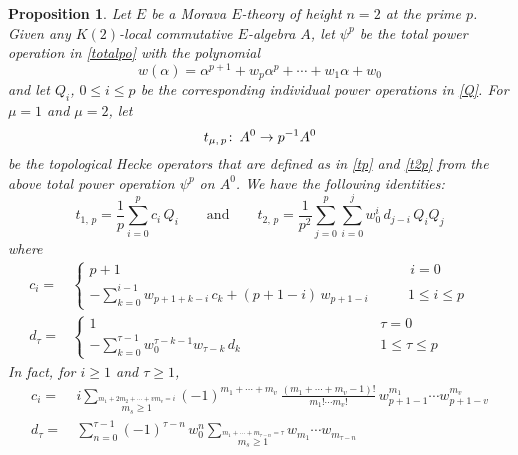 \documentclass{gtpart}
\newtheorem{prop}[equation]{Proposition}
\theoremstyle{definition}
\theoremstyle{remark}
\def\co{\colon\thinspace}
\newcommand{\ad}{\text{and}}
\newcommand{\A}{\alpha}
\newcommand{\T}{\tau}
\renewcommand{\=}{\approx}
\renewcommand{\-}{\sim}
\numberwithin{equation}{section}
\begin{document}
\begin{prop}
 \label{prop:Q}
 Let $E$ be a Morava $E$-theory of height $n = 2$ at the prime $p$.  Given any 
 $K(2)$-local commutative $E$-algebra $A$, let $\psi^p$ be the total power 
 operation in \eqref{totalpo} with the polynomial 
 \begin{equation}
  \label{wi}
  w(\A) = \A^{p + 1} + w_p \A^p + \cdots + w_1 \A + w_0 
 \end{equation}
 and let $Q_i$, $0 \leq i \leq p$ be the corresponding individual power 
 operations in \eqref{Q}.  For $\mu = 1$ and $\mu = 2$, let 
 \[
  t_{\mu,\,p} \co A^0 \to p^{-1} A^0 
 \]
 be the topological Hecke operators that are defined as in \eqref{tp} and 
 \eqref{t2p} from the above total power operation $\psi^p$ on $A^0$.  We have 
 the following identities: 
 \[
  t_{1,\,p} = \frac{1}{p} \sum_{i = 0}^p c_i \, Q_i \qquad \ad \qquad t_{2,\,p} 
  = \frac{1}{p^2} \sum_{j = 0}^p \sum_{i = 0}^j w_0^i \, d_{j - i} \, Q_i Q_j 
 \]
 where 
 \begin{equation*}
  \begin{split}
   c_i = & \left\{\!\!
   \begin{array}{ll}
    p + 1 & \qquad\, i = 0 \\
    -\sum_{k = 0}^{i - 1} w_{p + 1 + k - i} \, c_k + (p + 1 - i) \, 
    w_{p + 1 - i} & \qquad 1 \leq i \leq p 
   \end{array}
   \right.\\
   d_\T = & \left\{\!\!
   \begin{array}{ll}
    1 & \qquad\qquad\qquad\qquad\quad\, \T = 0 \\
    -\sum_{k = 0}^{\T - 1} w_0^{\T - k - 1} w_{\T - k} \, d_k & 
    \qquad\qquad\qquad\qquad\quad\, 1 \leq \T \leq p 
   \end{array}
   \right.\qquad\quad~\,
  \end{split}
 \end{equation*}
 In fact, for $i \geq 1$ and $\T \geq 1$, 
 \begin{equation*}
  \begin{split}
    c_i = & ~ i \sum_{\stackrel{\scriptstyle m_1 + 2 m_2 + \cdots + v m_v = i}
            {m_s \geq 1}} (-1)^{m_1 + \cdots + m_v} \, 
            \frac{(m_1 + \cdots + m_v - 1)!}{m_1! \cdots m_v!} \, 
            w_{p + 1 - 1}^{m_1} \cdots w_{p + 1 - v}^{m_v} \\
   d_\T = & ~ \sum_{n = 0}^{\T - 1} (-1)^{\T - n} \, w_0^n 
            \sum_{\stackrel{\scriptstyle m_1 + \cdots + m_{\T - n} = \T}
            {m_s \geq 1}} w_{m_1} \cdots w_{m_{\T - n}} 
  \end{split}
 \end{equation*}
\end{prop}
\end{document}
